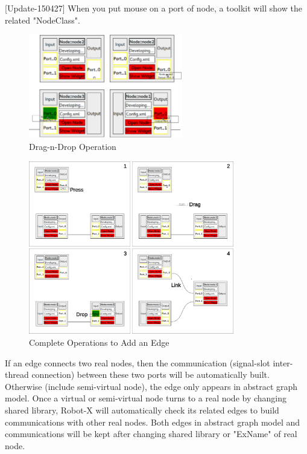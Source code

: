 \documentclass[a4paper,10pt]{book}
\begin{document}
[Update-150427] When you put mouse on a port of node, a toolkit will show the related "NodeClass".

\begin{figure}
 \centering
 \includegraphics[width=0.6\textwidth]{img/dragdrop.eps}
 \caption{Drag-n-Drop Operation}
 \label{fig:dragdrop}
\end{figure}

\begin{figure}
 \centering
 \includegraphics[width=0.8\textwidth]{img/addedge.eps}
 \caption{Complete Operations to Add an Edge}
 \label{fig:addedge}
\end{figure}

If an edge connects two real nodes, then the communication (signal-slot inter-thread connection) between these two ports will be automatically built. Otherwise (include semi-virtual node), the edge only appears in abstract graph model. Once a virtual or semi-virtual node turns to a real node by changing shared library, Robot-X will automatically check its related edges to build communications with other real nodes. Both edges in abstract graph model and communications will be kept after changing shared library or "ExName" of real node.  
\end{document}
